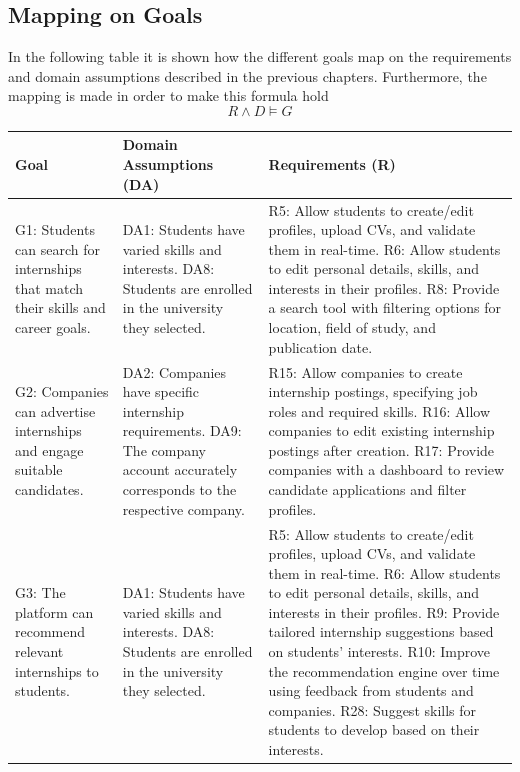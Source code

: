 \subsection{Mapping on Goals}
In the following table it is shown how the different goals map on the requirements and domain assumptions described in the previous chapters. Furthermore, the mapping is made in order to make this formula hold
\begin{equation}
    R \land D \models G
\end{equation}
\begin{longtable}{| p{} | p{} | p{} |}
    \hline
    \textbf{Goal} & \textbf{Domain Assumptions (DA)} & \textbf{Requirements (R)} \\
    \hline
    G1: Students can search for internships that match their skills and career goals. & DA1: Students have varied skills and interests. \newline DA8: Students are enrolled in the university they selected. & R5: Allow students to create/edit profiles, upload CVs, and validate them in real-time. \newline R6: Allow students to edit personal details, skills, and interests in their profiles. \newline R8: Provide a search tool with filtering options for location, field of study, and publication date. \\ \hline

    G2: Companies can advertise internships and engage suitable candidates. & DA2: Companies have specific internship requirements. \newline DA9: The company account accurately corresponds to the respective company. & R15: Allow companies to create internship postings, specifying job roles and required skills. \newline R16: Allow companies to edit existing internship postings after creation. \newline R17: Provide companies with a dashboard to review candidate applications and filter profiles. \\ \hline

    G3: The platform can recommend relevant internships to students. & DA1: Students have varied skills and interests. \newline DA8: Students are enrolled in the university they selected. & R5: Allow students to create/edit profiles, upload CVs, and validate them in real-time. \newline R6: Allow students to edit personal details, skills, and interests in their profiles. \newline R9: Provide tailored internship suggestions based on students' interests. \newline R10: Improve the recommendation engine over time using feedback from students and companies. \newline R28: Suggest skills for students to develop based on their interests. \\ \hline


\end{longtable}
